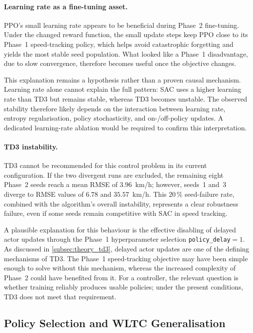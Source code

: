 \paragraph{Learning rate as a fine-tuning asset.}
PPO's small learning rate appears to be beneficial during Phase~2 fine-tuning. Under the changed reward function, the small update steps keep PPO close to its Phase~1 speed-tracking policy, which helps avoid catastrophic forgetting and yields the most stable seed population. What looked like a Phase~1 disadvantage, due to slow convergence, therefore becomes useful once the objective changes.

This explanation remains a hypothesis rather than a proven causal mechanism. Learning rate alone cannot explain the full pattern: SAC uses a higher learning rate than TD3 but remains stable, whereas TD3 becomes unstable. The observed stability therefore likely depends on the interaction between learning rate, entropy regularisation, policy stochasticity, and on-/off-policy updates. A dedicated learning-rate ablation would be required to confirm this interpretation.

\paragraph{TD3 instability.}
\ac{TD3} cannot be recommended for this control problem in its current configuration. If the two divergent runs are excluded, the remaining eight Phase~2 seeds reach a mean \ac{RMSE} of $3.96$~km/h; however, seeds~1 and~3 diverge to \ac{RMSE} values of $6.78$ and $35.57$~km/h. This $20\,\%$ seed-failure rate, combined with the algorithm's overall instability, represents a clear robustness failure, even if some seeds remain competitive with SAC in speed tracking.

A plausible explanation for this behaviour is the effective disabling of delayed actor updates through the Phase~1 hyperparameter selection \texttt{policy\_delay}$=1$. As discussed in \autoref{subsec:theory_td3}, delayed actor updates are one of the defining mechanisms of \ac{TD3}. The Phase~1 speed-tracking objective may have been simple enough to solve without this mechanism, whereas the increased complexity of Phase~2 could have benefited from it. For a controller, the relevant question is whether training reliably produces usable policies; under the present conditions, TD3 does not meet that requirement.

\subsection{Policy Selection and WLTC Generalisation}


